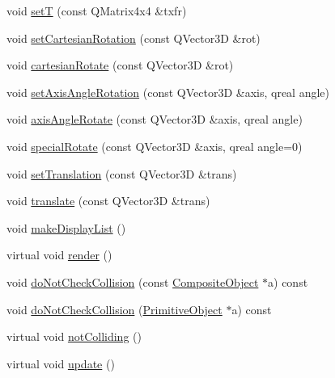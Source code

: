 \begin{DoxyCompactItemize}
\item 
void \hyperlink{class_robot_model_1_1_composite_object_abd48ac40b21178f5306ddfa6c92ea3c3}{setT} (const QMatrix4x4 \&txfr)
\item 
void \hyperlink{class_robot_model_1_1_composite_object_a12e8961ebc63d8a253d915b29b356162}{setCartesianRotation} (const QVector3D \&rot)
\item 
void \hyperlink{class_robot_model_1_1_composite_object_adadc29cccbba9cb615eaf0ad2fbdd337}{cartesianRotate} (const QVector3D \&rot)
\item 
void \hyperlink{class_robot_model_1_1_composite_object_a43f99ed52def7114d310e29fc6db83f3}{setAxisAngleRotation} (const QVector3D \&axis, qreal angle)
\item 
void \hyperlink{class_robot_model_1_1_composite_object_a357f5ed3f49e0889df511271e468f866}{axisAngleRotate} (const QVector3D \&axis, qreal angle)
\item 
void \hyperlink{class_robot_model_1_1_composite_object_ad44b9c1759209367754dafd77c984d6f}{specialRotate} (const QVector3D \&axis, qreal angle=0)
\item 
void \hyperlink{class_robot_model_1_1_composite_object_ae925e59246174c9d3b74d459b32835e3}{setTranslation} (const QVector3D \&trans)
\item 
void \hyperlink{class_robot_model_1_1_composite_object_afd942b7fa3b18bcc01c3fba417a6c027}{translate} (const QVector3D \&trans)
\item 
void \hyperlink{class_robot_model_1_1_composite_object_a5aa475cb09f0e9b9089a941848f9e189}{makeDisplayList} ()
\item 
virtual void \hyperlink{class_robot_model_1_1_composite_object_aee43da74b22f6272736844effe7a1dd6}{render} ()
\item 
void \hyperlink{class_robot_model_1_1_composite_object_ab6dc53258a7cdb53a22af63688d50ddd}{doNotCheckCollision} (const \hyperlink{class_robot_model_1_1_composite_object}{CompositeObject} $\ast$a) const 
\item 
void \hyperlink{class_robot_model_1_1_composite_object_a788711732ec5994c3f3a09321e2c5a18}{doNotCheckCollision} (\hyperlink{class_robot_model_1_1_primitive_object}{PrimitiveObject} $\ast$a) const 
\item 
virtual void \hyperlink{class_robot_model_1_1_composite_object_a00db0d1a45893ef058e7abbad5083b6b}{notColliding} ()
\item 
virtual void \hyperlink{class_robot_model_1_1_composite_object_aacfefeee128f748e4e705708b9d958e3}{update} ()
\end{DoxyCompactItemize}
